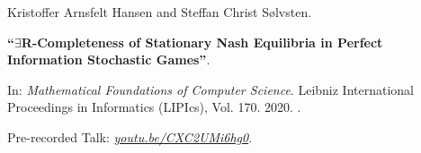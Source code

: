 Kristoffer Arnsfelt Hansen and Steffan Christ Sølvsten.

{\bf ``$\exists$R-Completeness of Stationary Nash Equilibria in Perfect
  Information Stochastic Games''}.

In: \emph{Mathematical Foundations of Computer Science}. Leibniz International
  Proceedings in Informatics (LIPIcs), Vol. 170. 2020.
  .

\medskip

Pre-recorded Talk: \href{https://youtu.be/CXC2UMi6hg0}{\emph{youtu.be/CXC2UMi6hg0}}.

\label{cite:2020.mfcs}